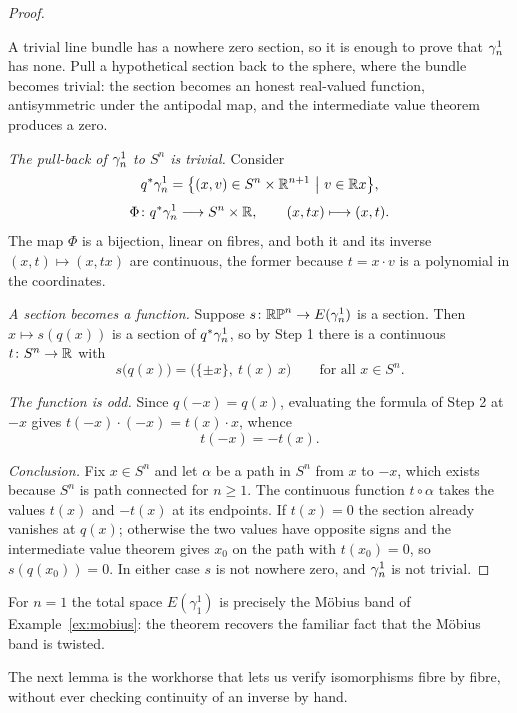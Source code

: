 \begin{proof}
\begin{strategy}
A trivial line bundle has a nowhere zero section, so it is enough to prove that
$\gamma^1_n$ has none. Pull a hypothetical section back to the sphere, where the
bundle becomes trivial: the section becomes an honest real-valued function,
antisymmetric under the antipodal map, and the intermediate value theorem
produces a zero.
\end{strategy}

 \emph{The pull-back of $\gamma^1_n$ to $S^n$ is trivial.} Consider
\[
q^*\gamma^1_n
=\big\{(x,v)\in S^n\times\mathbb{R}^{n+1}\ \big|\ v\in\mathbb{R} x\big\},
\]
\[
\Phi\colon q^*\gamma^1_n\longrightarrow S^n\times\mathbb{R},
\qquad (x,tx)\longmapsto (x,t).
\]
The map $\Phi$ is a bijection, linear on fibres, and both it and its inverse
$(x,t)\mapsto(x,tx)$ are continuous, the former because $t=x\cdot v$ is a
polynomial in the coordinates.

 \emph{A section becomes a function.} Suppose $s\colon\mathbb{RP}^n\to E(\gamma^1_n)$
is a section. Then $x\mapsto s(q(x))$ is a section of $q^*\gamma^1_n$, so by Step 1
there is a continuous $t\colon S^n\to\mathbb{R}$ with
\[
s\big(q(x)\big)=\big(\{\pm x\},\ t(x)\,x\big)
\qquad\text{for all }x\in S^n.
\]

 \emph{The function is odd.} Since $q(-x)=q(x)$, evaluating the formula
of Step 2 at $-x$ gives $t(-x)\cdot(-x)=t(x)\cdot x$, whence
\[
t(-x)=-t(x).
\]

 \emph{Conclusion.} Fix $x\in S^n$ and let $\alpha$ be a path in $S^n$
from $x$ to $-x$, which exists because $S^n$ is path connected for $n\ge1$. The
continuous function $t\circ\alpha$ takes the values $t(x)$ and $-t(x)$ at its
endpoints. If $t(x)=0$ the section already vanishes at $q(x)$; otherwise the
two values have opposite signs and the intermediate value theorem gives
$x_0$ on the path with $t(x_0)=0$, so $s(q(x_0))=0$. In either case $s$ is not
nowhere zero, and $\gamma^1_n$ is not trivial.
\end{proof}

\begin{remark}
For $n=1$ the total space $E(\gamma^1_1)$ is precisely the M\"obius band of
Example~\ref{ex:mobius}: the theorem recovers the familiar fact that the
M\"obius band is twisted.
\end{remark}

The next lemma is the workhorse that lets us verify isomorphisms fibre by fibre,
without ever checking continuity of an inverse by hand.

